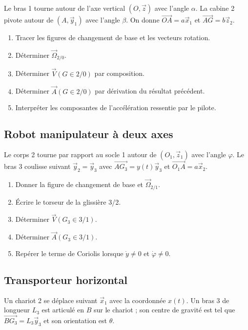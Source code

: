 Le bras 1 tourne autour de l'axe vertical $(O,\vec z)$ avec l'angle
$\alpha$. La cabine 2 pivote autour de $(A,\vec y_1)$ avec l'angle
$\beta$. On donne $\overrightarrow{OA}=a\vec x_1$ et
$\overrightarrow{AG}=b\vec z_2$.


\begin{enumerate}
  \item Tracer les figures de changement de base et les vecteurs rotation.
  \item Déterminer $\vec\Omega_{2/0}$.
  \item Déterminer $\vec V(G\in2/0)$ par composition.
  \item Déterminer $\vec A(G\in2/0)$ par dérivation du résultat précédent.
  \item Interpréter les composantes de l'accélération ressentie par le pilote.
\end{enumerate}

\subsection{Robot manipulateur à deux axes}

Le corps 2 tourne par rapport au socle 1 autour de
$(O_1,\vec z_1)$ avec l'angle $\varphi$. Le bras 3 coulisse suivant
$\vec y_2=\vec y_3$ avec
$\overrightarrow{AG_3}=y(t)\vec y_3$ et
$\overrightarrow{O_1A}=a\vec x_2$.


\begin{enumerate}
  \item Donner la figure de changement de base et $\vec\Omega_{2/1}$.
  \item Écrire le torseur de la glissière 3/2.
  \item Déterminer $\vec V(G_3\in3/1)$.
  \item Déterminer $\vec A(G_3\in3/1)$.
  \item Repérer le terme de Coriolis lorsque $\dot y\neq0$ et $\dot\varphi\neq0$.
\end{enumerate}

\subsection{Transporteur horizontal}

Un chariot 2 se déplace suivant $\vec x_1$ avec la coordonnée $x(t)$.
Un bras 3 de longueur $L_3$ est articulé en $B$ sur le chariot ; son
centre de gravité est tel que
$\overrightarrow{BG_3}=L_3\vec y_3$ et son orientation est $\theta$.


